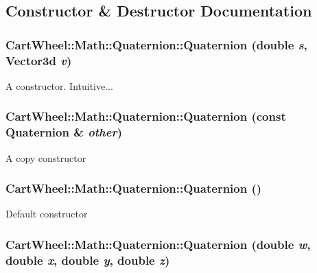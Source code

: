 \subsection{Constructor \& Destructor Documentation}
\hypertarget{classCartWheel_1_1Math_1_1Quaternion_a50893666ee58437ff454a27f635fcc56}{
\subsubsection[{Quaternion}]{\setlength{\rightskip}{0pt plus 5cm}CartWheel::Math::Quaternion::Quaternion (double {\em s}, \/  {\bf Vector3d} {\em v})}}
\label{classCartWheel_1_1Math_1_1Quaternion_a50893666ee58437ff454a27f635fcc56}
A constructor. Intuitive... \hypertarget{classCartWheel_1_1Math_1_1Quaternion_af0ff54587a13b829e9c8cb704528185b}{
\subsubsection[{Quaternion}]{\setlength{\rightskip}{0pt plus 5cm}CartWheel::Math::Quaternion::Quaternion (const {\bf Quaternion} \& {\em other})}}
\label{classCartWheel_1_1Math_1_1Quaternion_af0ff54587a13b829e9c8cb704528185b}
A copy constructor \hypertarget{classCartWheel_1_1Math_1_1Quaternion_afd36229554b32c7af256edaed72acc78}{
\subsubsection[{Quaternion}]{\setlength{\rightskip}{0pt plus 5cm}CartWheel::Math::Quaternion::Quaternion ()}}
\label{classCartWheel_1_1Math_1_1Quaternion_afd36229554b32c7af256edaed72acc78}
Default constructor \hypertarget{classCartWheel_1_1Math_1_1Quaternion_add84f474836720f819997c46d4125b78}{
\subsubsection[{Quaternion}]{\setlength{\rightskip}{0pt plus 5cm}CartWheel::Math::Quaternion::Quaternion (double {\em w}, \/  double {\em x}, \/  double {\em y}, \/  double {\em z})}}

